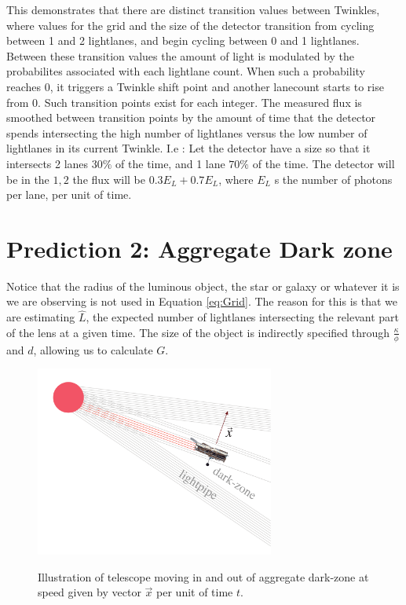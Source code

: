 \documentclass[notitlepage]{article}
\begin{document}
 


This demonstrates that there are distinct transition values between Twinkles, where values for the grid and the size of the detector transition from cycling between 1 and 2 lightlanes, and begin cycling between  0 and 1 lightlanes. Between these transition values the amount of light is modulated by the probabilites associated with each lightlane count. When such a probability reaches 0, it triggers a Twinkle shift point and another lanecount starts to rise from 0. Such transition points exist for each integer. The measured flux is smoothed between transition points by the amount of time that the detector spends intersecting the high number of lightlanes versus the low number of lightlanes in its current Twinkle. I.e : Let the detector have a size so that it intersects 2 lanes $ 30\% $ of the time, and 1 lane $ 70 \% $ of the time. The detector will be in the $ {1,2} $ the flux will be $0.3 E_L + 0.7 E_L $, where $ E_L  $ s the number of photons per lane, per unit of time.



\section{Prediction 2: Aggregate Dark zone}
Notice that the radius of the luminous object, the star or galaxy or whatever it is we are observing is not used in Equation \eqref{eq:Grid}. The reason for this is that we are estimating $\hat{L}$, the expected number of lightlanes intersecting the relevant part of the lens at a given time. The size of the object is indirectly specified through $\frac{\kappa}{\phi}$ and $d$, allowing us to calculate $G$.


\begin{figure}
\centering
{\includegraphics[width=0.7\textwidth, trim={0cm 0cm 0cm 0cm},clip]{illustrations/Hubble.pdf}}
\caption{Illustration of telescope moving in and out of aggregate dark-zone at speed given by vector $\vec{x} $ per unit of time $t$.  }\label{hubbleDarkZone}
\end{figure}
\end{document}
